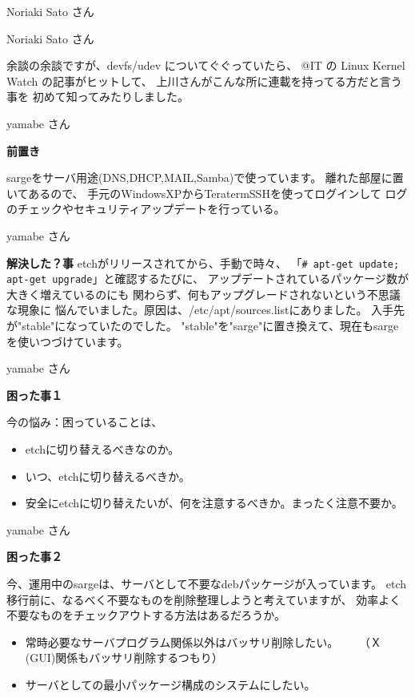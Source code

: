 \documentclass[cjk,dvipdfmx,12pt]{beamer}
\begin{document}
\begin{frame}{Noriaki Sato さん}
\end{frame}\begin{frame}{Noriaki Sato さん}

余談の余談ですが、devfs/udev についてぐぐっていたら、
@IT の Linux Kernel Watch の記事がヒットして、
上川さんがこんな所に連載を持ってる方だと言う事を
初めて知ってみたりしました。

\end{frame}\begin{frame}[containsverbatim]{yamabe さん}

\textbf{前置き}

sargeをサーバ用途(DNS,DHCP,MAIL,Samba)で使っています。
離れた部屋に置いてあるので、
手元のWindowsXPからTeratermSSHを使ってログインして
ログのチェックやセキュリティアップデートを行っている。

\end{frame}\begin{frame}[containsverbatim]{yamabe さん}

\textbf{解決した？事}
etchがリリースされてから、手動で時々、
「\verb!# apt-get update; apt-get upgrade!」と確認するたびに、
アップデートされているパッケージ数が大きく増えているのにも
関わらず、何もアップグレードされないという不思議な現象に
悩んでいました。原因は、/etc/apt/sources.listにありました。
入手先が"stable"になっていたのでした。
"stable"を"sarge"に置き換えて、現在もsargeを使いつづけています。

\end{frame}\begin{frame}[containsverbatim]{yamabe さん}

\textbf{困った事１}

今の悩み：困っていることは、

\begin{itemize}
\item etchに切り替えるべきなのか。
\item いつ、etchに切り替えるべきか。
\item 安全にetchに切り替えたいが、何を注意するべきか。まったく注意不要か。
\end{itemize}

\end{frame}\begin{frame}[containsverbatim]{yamabe さん}

\textbf{困った事２}

今、運用中のsargeは、サーバとして不要なdebパッケージが入っています。
etch移行前に、なるべく不要なものを削除整理しようと考えていますが、
効率よく不要なものをチェックアウトする方法はあるだろうか。
\begin{itemize}
\item 常時必要なサーバプログラム関係以外はバッサリ削除したい。
 　　（Ｘ(GUI)関係もバッサリ削除するつもり）
\item サーバとしての最小パッケージ構成のシステムにしたい。
\end{itemize}


\end{frame}
\end{document}
